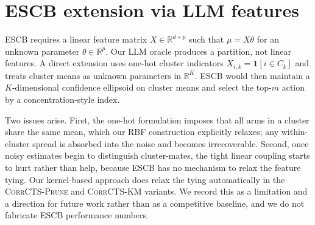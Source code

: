 \documentclass{article}
\theoremstyle{plain}
\theoremstyle{definition}
\theoremstyle{remark}
\newcommand{\R}{\mathbb{R}}
\newcommand{\EdgePrune}{\textsc{CorrCTS-Prune}}
\newcommand{\KMRefine}{\textsc{CorrCTS-KM}}
\begin{document}
\section{ESCB extension via LLM features}\label{app:escb}

ESCB \citep{combes2015combinatorial} requires a linear feature matrix $X \in \R^{d \times p}$ such that $\mu = X \theta$ for an unknown parameter $\theta \in \R^p$.
Our LLM oracle produces a partition, not linear features.
A direct extension uses one-hot cluster indicators $X_{i,k} = \mathbf{1}[i \in C_k]$ and treats cluster means as unknown parameters in $\R^K$.
ESCB would then maintain a $K$-dimensional confidence ellipsoid on cluster means and select the top-$m$ action by a concentration-style index.

Two issues arise.
First, the one-hot formulation imposes that all arms in a cluster share the same mean, which our RBF construction explicitly relaxes; any within-cluster spread is absorbed into the noise and becomes irrecoverable.
Second, once noisy estimates begin to distinguish cluster-mates, the tight linear coupling starts to hurt rather than help, because ESCB has no mechanism to relax the feature tying.
Our kernel-based approach does relax the tying automatically in the \EdgePrune{} and \KMRefine{} variants.
We record this as a limitation and a direction for future work rather than as a competitive baseline, and we do not fabricate ESCB performance numbers.
\end{document}
